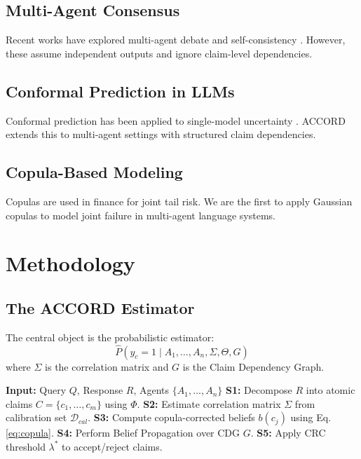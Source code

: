 \documentclass[conference]{IEEEtran}
\begin{document}
\subsection{Multi-Agent Consensus}
Recent works have explored multi-agent debate \cite{b2} and self-consistency \cite{b3}. However, these assume independent outputs and ignore claim-level dependencies.
\subsection{Conformal Prediction in LLMs}
Conformal prediction has been applied to single-model uncertainty \cite{b1}. ACCORD extends this to multi-agent settings with structured claim dependencies.
\subsection{Copula-Based Modeling}
Copulas are used in finance for joint tail risk. We are the first to apply Gaussian copulas to model joint failure in multi-agent language systems.

\section{Methodology}
\subsection{The ACCORD Estimator}
The central object is the probabilistic estimator:
\begin{equation}
\hat{P}(y_c = 1 \mid A_1, \dots, A_n, \Sigma, \Theta, G)
\end{equation}
where $\Sigma$ is the correlation matrix and $G$ is the Claim Dependency Graph.

\begin{algorithm}
\caption{ACCORD Inference Pipeline}
\begin{algorithmic}[1]
\STATE \textbf{Input:} Query $Q$, Response $R$, Agents $\{A_1, \dots, A_n\}$
\STATE \textbf{S1:} Decompose $R$ into atomic claims $C = \{c_1, \dots, c_m\}$ using $\Phi$.
\STATE \textbf{S2:} Estimate correlation matrix $\Sigma$ from calibration set $\mathcal{D}_{cal}$.
\STATE \textbf{S3:} Compute copula-corrected beliefs $b(c_j)$ using Eq. \eqref{eq:copula}.
\STATE \textbf{S4:} Perform Belief Propagation over CDG $G$.
\STATE \textbf{S5:} Apply CRC threshold $\lambda^*$ to accept/reject claims.
\end{algorithmic}
\end{algorithm}
\end{document}
